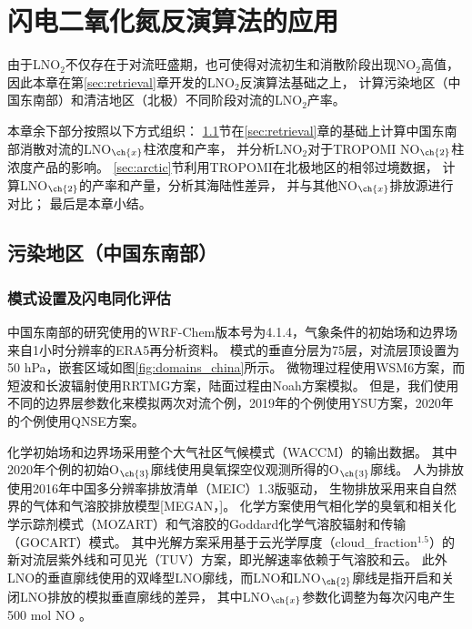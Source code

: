 
\chapter{闪电二氧化氮反演算法的应用} \label{chapter:PE}

由于LNO$_2$不仅存在于对流旺盛期，也可使得对流初生和消散阶段出现NO$_2$高值，
因此本章在第\ref{sec:retrieval}章开发的LNO$_2$反演算法基础之上，
计算污染地区（中国东南部）和清洁地区（北极）不同阶段对流的LNO$_2$产率。

本章余下部分按照以下方式组织：
\ref{sec:china}节在\ref{sec:retrieval}章的基础上计算中国东南部消散对流的LNO$_{\ch{x}}$柱浓度和产率，
并分析LNO$_2$对于TROPOMI NO$_{\ch{2}}$柱浓度产品的影响。
\ref{sec:arctic}节利用TROPOMI在北极地区的相邻过境数据，
计算LNO$_{\ch{2}}$的产率和产量，分析其海陆性差异，
并与其他NO$_{\ch{x}}$排放源进行对比；
最后是本章小结。


\section{污染地区（中国东南部）} \label{sec:china}

\subsection{模式设置及闪电同化评估} \label{sec:model_settings_china}

中国东南部的研究使用的WRF-Chem版本号为4.1.4，气象条件的初始场和边界场来自1小时分辨率的ERA5再分析资料。
模式的垂直分层为75层，对流层顶设置为50 hPa，嵌套区域如图\ref{fig:domains_china}所示。
微物理过程使用WSM6方案\citep{Hong.2006a}，而短波和长波辐射使用RRTMG方案\citep{Iacono.2008}，陆面过程由Noah方案模拟\citep{Koren.1999}。
但是，我们使用不同的边界层参数化来模拟两次对流个例，2019年的个例使用YSU方案\citep{Hong.2006}，2020年的个例使用QNSE方案\citep{Sukoriansky.2005}。

化学初始场和边界场采用整个大气社区气候模式（WACCM）的输出数据。
其中2020年个例的初始O$_{\ch{3}}$廓线使用臭氧探空仪观测所得的O$_{\ch{3}}$廓线。
人为排放使用2016年中国多分辨率排放清单（MEIC）1.3版驱动，
生物排放采用来自自然界的气体和气溶胶排放模型[MEGAN，\citet{Guenther.2006}]。
化学方案使用气相化学的臭氧和相关化学示踪剂模式（MOZART）和气溶胶的Goddard化学气溶胶辐射和传输（GOCART）模式\citep{Pfister.2011}。
其中光解方案采用基于云光学厚度（cloud\_fraction$^{1.5}$）的新对流层紫外线和可见光（TUV）方案，即光解速率依赖于气溶胶和云。
此外LNO的垂直廓线使用\citet{Ott.2010}的双峰型LNO廓线\citep{Laughner.2017}，而LNO和LNO$_{\ch{2}}$廓线是指开启和关闭LNO排放的模拟垂直廓线的差异，
其中LNO$_{\ch{x}}$参数化调整为每次闪电产生500 mol NO \citep{Zhu.2019}。


